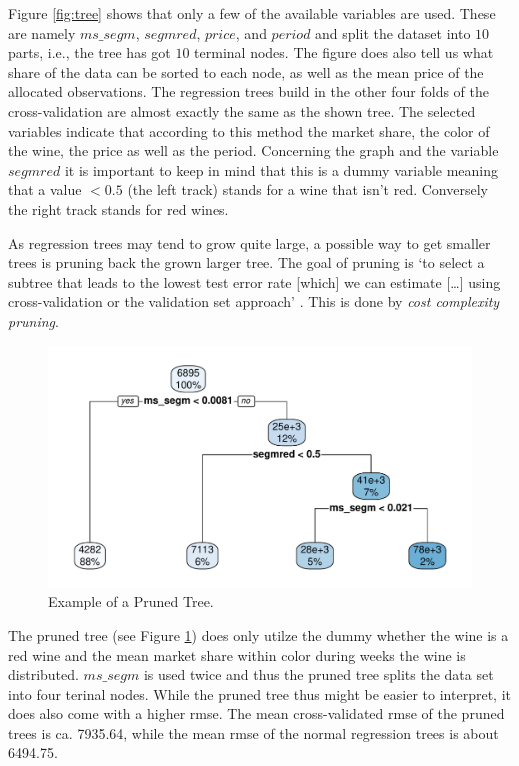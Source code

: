 \documentclass[11pt,]{article}
\begin{document}
Figure \ref{fig:tree} shows that only a few of the available variables
are used. These are namely \(ms\_segm\), \(segmred\), \(price\), and
\(period\) and split the dataset into \(10\) parts, i.e., the tree has
got \(10\) terminal nodes. The figure does also tell us what share of
the data can be sorted to each node, as well as the mean price of the
allocated observations. The regression trees build in the other four
folds of the cross-validation are almost exactly the same as the shown
tree. The selected variables indicate that according to this method the
market share, the color of the wine, the price as well as the period.
Concerning the graph and the variable \(segmred\) it is important to
keep in mind that this is a dummy variable meaning that a value
\(< 0.5\) (the left track) stands for a wine that isn't red. Conversely
the right track stands for red wines.

As regression trees may tend to grow quite large, a possible way to get
smaller trees is pruning back the grown larger tree. The goal of pruning
is `to select a subtree that leads to the lowest test error rate
{[}which{]} we can estimate {[}\ldots{}{]} using cross-validation or the
validation set approach' \autocite[][p. 308]{James2014}. This is done by
\emph{cost complexity pruning}.

\begin{figure}
\centering
\includegraphics{../00_data/output_paper/09_tree_pruned.pdf}
\caption{\label{fig:tree_pruned}Example of a Pruned Tree.}
\end{figure}

The pruned tree (see Figure \ref{fig:tree_pruned}) does only utilze the
dummy whether the wine is a red wine and the mean market share within
color during weeks the wine is distributed. \(ms\_segm\) is used twice
and thus the pruned tree splits the data set into four terinal nodes.
While the pruned tree thus might be easier to interpret, it does also
come with a higher \ac{rmse}. The mean cross-validated \ac{rmse} of the
pruned trees is ca. 7935.64, while the mean \ac{rmse} of the normal
regression trees is about 6494.75.
\end{document}
